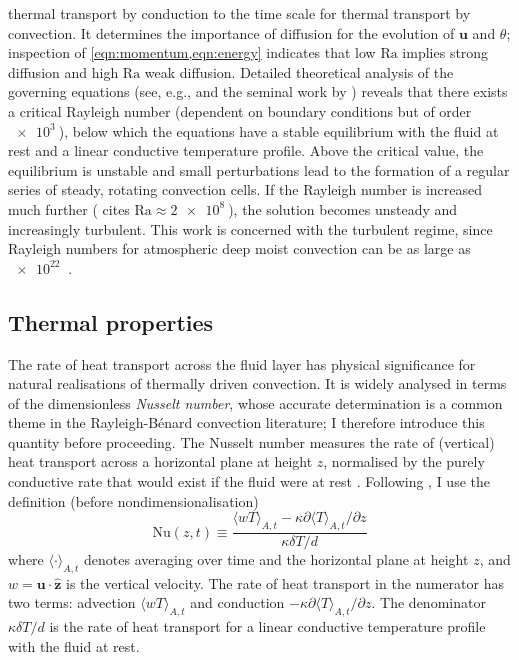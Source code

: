 \documentclass[titlepage,twoside]{article}
\numberwithin{equation}{section}
\renewcommand\vec{\bm}
\newcommand{\uvec}[1]{\vec{\hat{#1}}}
\newcommand{\rayleigh}{\ensuremath{\mathrm{Ra}}}
\newcommand{\nusselt}{\ensuremath{\mathrm{Nu}}}
\newcommand{\rb}{Rayleigh-B\'{e}nard}
\begin{document}
thermal transport by conduction to the time scale for
thermal transport by convection. It determines the importance of diffusion for the evolution of
$\vec{u}$ and $\theta$; inspection of \cref{eqn:momentum,eqn:energy} indicates
that low $\rayleigh$ implies strong diffusion and high $\rayleigh$ weak
diffusion. Detailed theoretical analysis of the governing equations (see, e.g.,
\textcite{chandrasekhar1961} and the seminal work by \textcite{rayleigh1916})
reveals that there exists a critical Rayleigh number (dependent on boundary
conditions but of order $\SI{e3}{}$), below which the equations have a stable
equilibrium with the fluid at rest and a linear conductive temperature profile.
Above the critical value, the equilibrium is unstable and small perturbations
lead to the formation of a regular series of steady, rotating convection cells.
If the Rayleigh number is increased much further (\textcite{le_quere1991} cites
$\rayleigh \approx \SI{2e8}{}$), the solution becomes unsteady and increasingly
turbulent. This work is concerned with the turbulent regime, since Rayleigh
numbers for atmospheric deep moist convection can be as large as $\SI{e22}{}$
\parencite{chilla2012}.

\subsection{Thermal properties}
The rate of heat transport across the fluid layer has physical significance for
natural realisations of thermally driven convection. It is widely analysed in
terms of the dimensionless \emph{Nusselt number}, whose accurate determination
is a common theme in the \rb{} convection literature; I therefore introduce
this quantity before proceeding. The Nusselt number measures the rate of
(vertical) heat transport across a horizontal plane at height $z$, normalised
by the purely conductive rate that would exist if the fluid were at rest
\parencite{verzicco1999}. Following \textcite{chilla2012}, I use the definition
(before nondimensionalisation)
\begin{equation}
    \label{eqn:dim_nusselt}
    \nusselt(z,t) \equiv \frac{
        \langle wT \rangle_{A,t}
        - \kappa \partial \langle T \rangle_{A,t} / \partial z
    }{
        \kappa \delta T / d
    }
\end{equation}
where $\langle \cdot \rangle_{A,t}$ denotes averaging over time and the
horizontal plane at height $z$, and $w = \vec{u} \cdot \uvec{z}$ is the
vertical velocity. The rate of heat transport in the numerator has two terms:
advection $\langle wT \rangle_{A,t}$ and conduction $-\kappa \partial \langle T
\rangle_{A,t} / \partial z$. The denominator $\kappa \delta T / d$ is the rate
of heat transport for a linear conductive temperature profile with the fluid at
rest.
\end{document}
